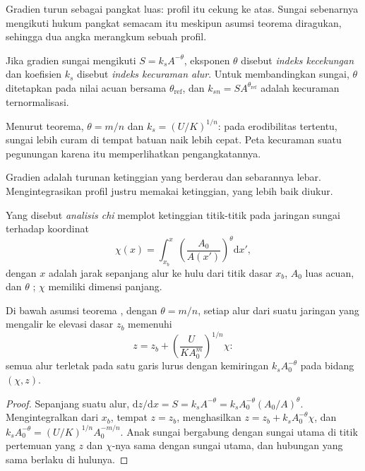 Gradien turun sebagai pangkat luas: profil itu cekung ke atas. Sungai
sebenarnya mengikuti hukum pangkat semacam itu meskipun asumsi teorema
diragukan, sehingga dua angka merangkum sebuah profil.

\begin{definition}\label{def:b3:quantitative-geomorphology:indices}
Jika gradien sungai mengikuti $S = k_s A^{-\theta}$, eksponen
$\theta$ disebut \emph{indeks kecekungan} dan
koefisien $k_s$ disebut \emph{indeks kecuraman alur}.
Untuk membandingkan sungai, $\theta$ ditetapkan pada nilai acuan bersama
$\theta_{\mathrm{ref}}$, dan $k_{sn} = S A^{\theta_{\mathrm{ref}}}$ adalah
kecuraman ternormalisasi.
\end{definition}

Menurut teorema, $\theta = m/n$ dan $k_s = (U/K)^{1/n}$: pada
erodibilitas tertentu, sungai lebih curam di tempat batuan naik lebih cepat. Peta kecuraman
suatu pegunungan karena itu memperlihatkan pengangkatannya.


Gradien adalah turunan ketinggian yang berderau dan sebarannya lebar. Mengintegrasikan
profil justru memakai ketinggian, yang lebih baik diukur.

\begin{definition}\label{def:b3:quantitative-geomorphology:chi}
Yang disebut \emph{analisis chi} memplot ketinggian titik-titik
pada jaringan sungai terhadap koordinat
\[
\chi(x) = \int_{x_b}^{x} \left(\frac{A_0}{A(x')}\right)^{\theta}
\mathrm{d}x' ,
\]
dengan $x$ adalah jarak sepanjang alur ke hulu dari titik dasar
$x_b$, $A_0$ luas acuan, dan $\theta$ ; $\chi$ memiliki
dimensi panjang.
\end{definition}

\begin{proposition}\label{prop:b3:quantitative-geomorphology:chi}
Di bawah asumsi teorema , dengan $\theta = m/n$,
setiap alur dari suatu jaringan yang mengalir ke elevasi dasar $z_b$ memenuhi
\[
z = z_b + \left(\frac{U}{K A_0^{m}}\right)^{1/n} \chi :
\]
semua alur terletak pada satu garis lurus dengan kemiringan $k_s A_0^{-\theta}$ pada
bidang $(\chi, z)$.
\end{proposition}

\begin{proof}
Sepanjang suatu alur, $\mathrm{d}z/\mathrm{d}x = S = k_s A^{-\theta} = k_s
A_0^{-\theta}(A_0/A)^{\theta}$. Mengintegralkan dari $x_b$, tempat $z = z_b$,
menghasilkan $z = z_b + k_s A_0^{-\theta}\chi$, dan $k_s A_0^{-\theta} =
(U/K)^{1/n} A_0^{-m/n}$. Anak sungai bergabung dengan sungai utama di titik pertemuan yang
$z$ dan $\chi$-nya sama dengan sungai utama, dan hubungan yang sama berlaku di hulunya.
\end{proof}

